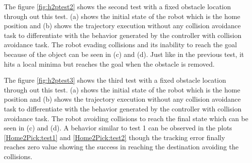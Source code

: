 The figure \ref{fig:h2ptest2} shows the second test with a fixed obstacle location through out this test. (a) shows the initial state of the robot which is the home position and (b) shows the trajectory execution without any collision avoidance task to differentiate with the behavior generated by the controller with collision avoidance task. The robot evading collisions and its inability to reach the goal because of the object can be seen in (c) and (d). Just like in the previous test, it hits a local minima but reaches the goal when the obstacle is removed. 

The figure \ref{fig:h2ptest3} shows the third test with a fixed obstacle location through out this test. (a) shows the initial state of the robot which is the home position and (b) shows the trajectory execution without any collision avoidance task to differentiate with the behavior generated by the controller with collision avoidance task. The robot avoiding collisions to reach the final state which can be seen in (c) and (d). A behavior similar to test 1 can be observed in the plots \ref{Home2Pick:test1} and \ref{Home2Pick:test2} though the tracking error finally reaches zero value showing the success in reaching the destination avoiding the collisions.

